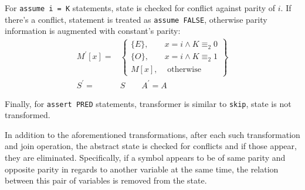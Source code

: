 For \texttt{assume i = K} statements, state is checked for conflict against parity of $i$. If there's a conflict, statement is treated as  \texttt{assume FALSE}, otherwise parity information is augmented with constant's parity:
\begin{align*}
M^\prime[x] = & \left.
	\begin{cases}
		\{E\}, & x = i \wedge K \equiv_{2} 0 \\
		\{O\}, & x = i \wedge K \equiv_{2} 1 \\
		M[x], & \text{ otherwise}
	\end{cases}
\right\}\\
S^\prime = & S \qquad
A^\prime =  A
\end{align*}


Finally, for \texttt{assert PRED} statements, transformer is similar to \texttt{skip}, state is not transformed.

In addition to the aforementioned transformations, after each such transformation and join operation, the abstract state is checked for conflicts and if those appear, they are eliminated. Specifically, if a symbol appears to be of same parity and opposite parity in regards to another variable at the same time, the relation between this pair of variables is removed from the state.
